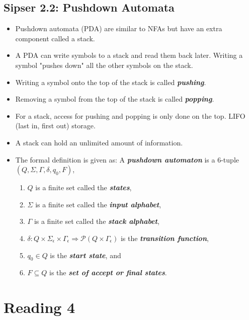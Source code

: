 \documentclass{article}
\begin{document}
\subsection{Sipser 2.2: Pushdown Automata}
\begin{itemize}
    \item Pushdown automata (PDA) are similar to NFAs but have an extra component called a stack.
    \item A PDA can write symbols to a stack and read them back later. Writing a symbol "pushes down" all the other symbols on the stack.
    \item Writing a symbol onto the top of the stack is called \textbf{\textit{pushing}}.
    \item Removing a symbol from the top of the stack is called \textbf{\textit{popping}}.
    \item For a stack, access for pushing and popping is only done on the top. LIFO (last in, first out) storage.
    \item A stack can hold an unlimited amount of information.
    \item The formal definition is given as: A \textbf{\textit{pushdown automaton}} is a 6-tuple $(Q,\Sigma,\Gamma,\delta,q_0,F)$, 
    \begin{enumerate}
        \item $Q$ is a finite set called the \textbf{\textit{states}},
        \item $\Sigma$ is a finite set called the \textbf{\textit{input alphabet}},
        \item $\Gamma$ is a finite set called the \textbf{\textit{stack alphabet}},
        \item $\delta: Q \times \Sigma_\epsilon \times \Gamma_\epsilon \Rightarrow \mathcal{P}(Q\times\Gamma_\epsilon)$ is the \textbf{\textit{transition function}},
        \item $q_0 \in Q$ is the \textbf{\textit{start state}}, and
        \item $F \subseteq Q$ is the \textbf{\textit{set of accept or final states}}.
    \end{enumerate}
    
\end{itemize}

\section{Reading 4}
\end{document}

